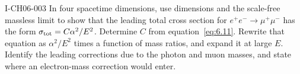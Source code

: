 \begin{exercise}{I-CH06-003}
In four spacetime dimensions, use dimensions and the scale-free massless
limit to show that the leading total cross section for
\(e^+e^-\to\mu^+\mu^-\) has the form
\(\sigma_{\rm tot}=C\alpha^2/E^2\).  Determine \(C\) from
equation~\eqref{eq:6.11}.  Rewrite that equation as \(\alpha^2/E^2\)
times a function of mass ratios, and expand it at large \(E\).  Identify
the leading corrections due to the photon and muon masses, and state where
an electron-mass correction would enter.
\end{exercise}
